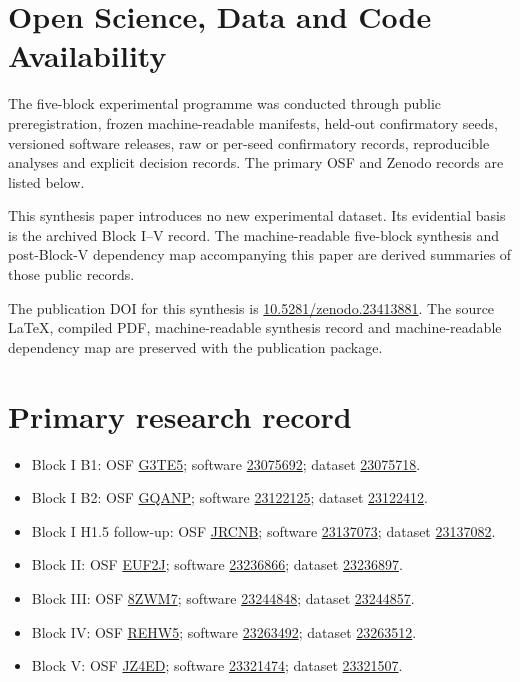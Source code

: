 \documentclass[11pt,a4paper]{article}
\begin{document}
\section{Open Science, Data and Code Availability}

The five-block experimental programme was conducted through public preregistration, frozen machine-readable manifests, held-out confirmatory seeds, versioned software releases, raw or per-seed confirmatory records, reproducible analyses and explicit decision records. The primary OSF and Zenodo records are listed below.

This synthesis paper introduces no new experimental dataset. Its evidential basis is the archived Block I--V record. The machine-readable five-block synthesis and post-Block-V dependency map accompanying this paper are derived summaries of those public records.

The publication DOI for this synthesis is \href{https://doi.org/10.5281/zenodo.23413881}{10.5281/zenodo.23413881}. The source \LaTeX, compiled PDF, machine-readable synthesis record and machine-readable dependency map are preserved with the publication package.


\section*{Primary research record}

\begin{itemize}[leftmargin=*]
\item Block I B1: OSF \href{https://doi.org/10.17605/OSF.IO/G3TE5}{G3TE5}; software \href{https://doi.org/10.5281/zenodo.23075692}{23075692}; dataset \href{https://doi.org/10.5281/zenodo.23075718}{23075718}.
\item Block I B2: OSF \href{https://doi.org/10.17605/OSF.IO/GQANP}{GQANP}; software \href{https://doi.org/10.5281/zenodo.23122125}{23122125}; dataset \href{https://doi.org/10.5281/zenodo.23122412}{23122412}.
\item Block I H1.5 follow-up: OSF \href{https://doi.org/10.17605/OSF.IO/JRCNB}{JRCNB}; software \href{https://doi.org/10.5281/zenodo.23137073}{23137073}; dataset \href{https://doi.org/10.5281/zenodo.23137082}{23137082}.
\item Block II: OSF \href{https://doi.org/10.17605/OSF.IO/EUF2J}{EUF2J}; software \href{https://doi.org/10.5281/zenodo.23236866}{23236866}; dataset \href{https://doi.org/10.5281/zenodo.23236897}{23236897}.
\item Block III: OSF \href{https://doi.org/10.17605/OSF.IO/8ZWM7}{8ZWM7}; software \href{https://doi.org/10.5281/zenodo.23244848}{23244848}; dataset \href{https://doi.org/10.5281/zenodo.23244857}{23244857}.
\item Block IV: OSF \href{https://doi.org/10.17605/OSF.IO/REHW5}{REHW5}; software \href{https://doi.org/10.5281/zenodo.23263492}{23263492}; dataset \href{https://doi.org/10.5281/zenodo.23263512}{23263512}.
\item Block V: OSF \href{https://doi.org/10.17605/OSF.IO/JZ4ED}{JZ4ED}; software \href{https://doi.org/10.5281/zenodo.23321474}{23321474}; dataset \href{https://doi.org/10.5281/zenodo.23321507}{23321507}.
\end{itemize}
\end{document}
